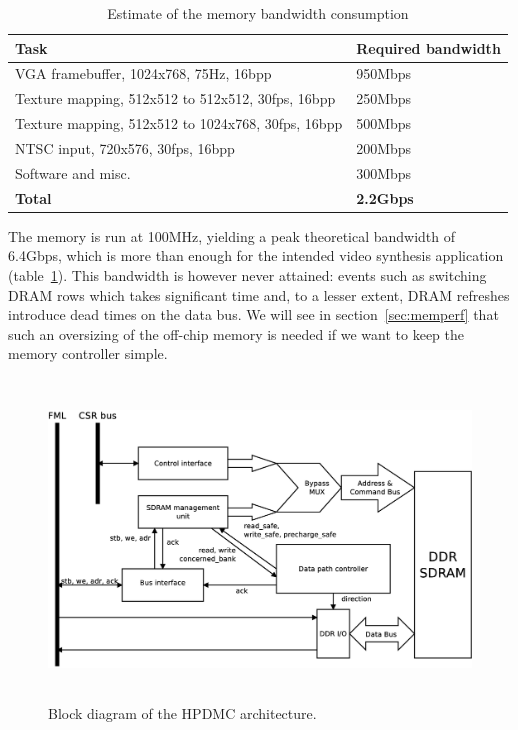 \documentclass[a4paper,11pt]{kthesis}
\begin{document}
\begin{table}
\centering
\begin{tabular}{|l|l|}
\hline
\textbf{Task} & \textbf{Required bandwidth} \\
\hline
VGA framebuffer, 1024x768, 75Hz, 16bpp & 950Mbps \\
\hline
Texture mapping, 512x512 to 512x512, 30fps, 16bpp & 250Mbps \\
\hline
Texture mapping, 512x512 to 1024x768, 30fps, 16bpp & 500Mbps \\
\hline
NTSC input, 720x576, 30fps, 16bpp & 200Mbps \\
\hline
Software and misc. & 300Mbps \\
\hline
\textbf{Total} & \textbf{2.2Gbps} \\
\hline
\end{tabular}
\label{tab:membw}
\caption{Estimate of the memory bandwidth consumption}
\end{table}

The memory is run at 100MHz, yielding a peak theoretical bandwidth of 6.4Gbps, which is more than enough for the intended video synthesis application (table~\ref{tab:membw}). This bandwidth is however never attained: events such as switching DRAM rows which takes significant time and, to a lesser extent, DRAM refreshes introduce dead times on the data bus. We will see in section~\ref{sec:memperf} that such an oversizing of the off-chip memory is needed if we want to keep the memory controller simple.

\begin{figure}[H]
\centering
\includegraphics[height=85mm]{hpdmc_block.eps}
\caption{Block diagram of the HPDMC architecture.}\label{fig:hpdmc_block}
\end{figure}
\end{document}
